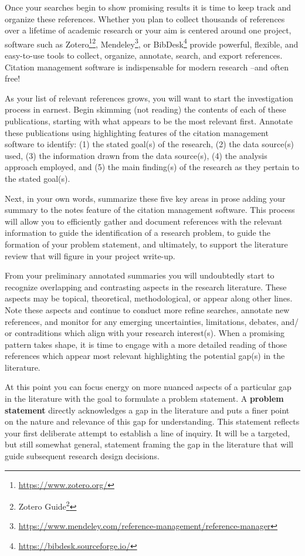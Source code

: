 \documentclass[
  letterpaper,
]{book}
\theoremstyle{definition}
\theoremstyle{remark}
\DeclareRobustCommand{\href}[2]{#2\footnote{\url{#1}}}
\begin{document}
Once your searches begin to show promising results it is time to keep
track and organize these references. Whether you plan to collect
thousands of references over a lifetime of academic research or your aim
is centered around one project, software such as
\href{https://www.zotero.org/}{Zotero}\footnote{\href{https://guides.zsr.wfu.edu/zotero}{Zotero
  Guide}},
\href{https://www.mendeley.com/reference-management/reference-manager}{Mendeley},
or \href{https://bibdesk.sourceforge.io/}{BibDesk} provide powerful,
flexible, and easy-to-use tools to collect, organize, annotate, search,
and export references. Citation management software is indispensable for
modern research --and often free!

As your list of relevant references grows, you will want to start the
investigation process in earnest. Begin skimming (not reading) the
contents of each of these publications, starting with what appears to be
the most relevant first. Annotate these publications using highlighting
features of the citation management software to identify: (1) the stated
goal(s) of the research, (2) the data source(s) used, (3) the
information drawn from the data source(s), (4) the analysis approach
employed, and (5) the main finding(s) of the research as they pertain to
the stated goal(s).

Next, in your own words, summarize these five key areas in prose adding
your summary to the notes feature of the citation management software.
This process will allow you to efficiently gather and document
references with the relevant information to guide the identification of
a research problem, to guide the formation of your problem statement,
and ultimately, to support the literature review that will figure in
your project write-up.

From your preliminary annotated summaries you will undoubtedly start to
recognize overlapping and contrasting aspects in the research
literature. These aspects may be topical, theoretical, methodological,
or appear along other lines. Note these aspects and continue to conduct
more refine searches, annotate new references, and monitor for any
emerging uncertainties, limitations, debates, and/ or contraditions
which align with your research interest(s). When a promising pattern
takes shape, it is time to engage with a more detailed reading of those
references which appear most relevant highlighting the potential gap(s)
in the literature.

At this point you can focus energy on more nuanced aspects of a
particular gap in the literature with the goal to formulate a problem
statement. A \textbf{problem statement} directly acknowledges a gap in
the literature and puts a finer point on the nature and relevance of
this gap for understanding. This statement reflects your first
deliberate attempt to establish a line of inquiry. It will be a
targeted, but still somewhat general, statement framing the gap in the
literature that will guide subsequent research design decisions.
\end{document}
